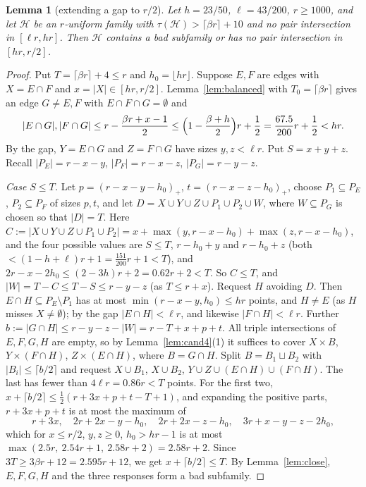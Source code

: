 \documentclass[11pt]{amsart}
\newtheorem{lemma}[theorem]{Lemma}
\theoremstyle{definition}
\theoremstyle{remark}
\newcommand{\cH}{\mathcal H}
\newcommand{\ceil}[1]{\lceil #1\rceil}
\newcommand{\floor}[1]{\lfloor #1\rfloor}
\begin{document}
\begin{lemma}[extending a gap to $r/2$]\label{lem:gapext}
Let $h=23/50$, $\ell=43/200$, $r\ge1000$, and let $\cH$ be an $r$-uniform family with $\tau(\cH)>\ceil{\beta r}+10$ and no pair intersection in $[\ell r,hr]$. Then $\cH$ contains a bad subfamily or has no pair intersection in $[hr,r/2]$.
\end{lemma}
\begin{proof}
Put $T=\ceil{\beta r}+4\le r$ and $h_0=\floor{hr}$. Suppose $E,F$ are edges with $X=E\cap F$ and $x=|X|\in[hr,r/2]$. Lemma~\ref{lem:balanced} with $T_0=\ceil{\beta r}$ gives an edge $G\ne E,F$ with $E\cap F\cap G=\emptyset$ and
\[
|E\cap G|,|F\cap G|\le r-\frac{\beta r+x-1}{2}\le\Bigl(1-\frac{\beta+h}{2}\Bigr)r+\frac12=\frac{67.5}{200}r+\frac12<hr .
\]
By the gap, $Y=E\cap G$ and $Z=F\cap G$ have sizes $y,z<\ell r$. Put $S=x+y+z$. Recall $|P_E|=r-x-y$, $|P_F|=r-x-z$, $|P_G|=r-y-z$.

\emph{Case $S\le T$.} Let $p=(r-x-y-h_0)_+$, $t=(r-x-z-h_0)_+$, choose $P_1\subseteq P_E$, $P_2\subseteq P_F$ of sizes $p,t$, and let $D=X\cup Y\cup Z\cup P_1\cup P_2\cup W$, where $W\subseteq P_G$ is chosen so that $|D|=T$. Here $C:=|X\cup Y\cup Z\cup P_1\cup P_2|=x+\max(y,r-x-h_0)+\max(z,r-x-h_0)$, and the four possible values are $S\le T$, $r-h_0+y$ and $r-h_0+z$ (both $<(1-h+\ell)r+1=\tfrac{151}{200}r+1<T$), and $2r-x-2h_0\le(2-3h)r+2=0.62r+2<T$. So $C\le T$, and $|W|=T-C\le T-S\le r-y-z$ (as $T\le r+x$). Request $H$ avoiding $D$. Then $E\cap H\subseteq P_E\setminus P_1$ has at most $\min(r-x-y,h_0)\le hr$ points, and $H\ne E$ (as $H$ misses $X\ne\emptyset$); by the gap $|E\cap H|<\ell r$, and likewise $|F\cap H|<\ell r$. Further $b:=|G\cap H|\le r-y-z-|W|=r-T+x+p+t$. All triple intersections of $E,F,G,H$ are empty, so by Lemma~\ref{lem:cand4}(1) it suffices to cover $X\times B$, $Y\times(F\cap H)$, $Z\times(E\cap H)$, where $B=G\cap H$. Split $B=B_1\sqcup B_2$ with $|B_i|\le\ceil{b/2}$ and request $X\cup B_1$, $X\cup B_2$, $Y\cup Z\cup(E\cap H)\cup(F\cap H)$. The last has fewer than $4\ell r=0.86r<T$ points. For the first two, $x+\ceil{b/2}\le\tfrac12(r+3x+p+t-T+1)$, and expanding the positive parts, $r+3x+p+t$ is at most the maximum of
\[
r+3x,\quad 2r+2x-y-h_0,\quad 2r+2x-z-h_0,\quad 3r+x-y-z-2h_0,
\]
which for $x\le r/2$, $y,z\ge0$, $h_0>hr-1$ is at most $\max(2.5r,\ 2.54r+1,\ 2.58r+2)=2.58r+2$. Since $3T\ge3\beta r+12=2.595r+12$, we get $x+\ceil{b/2}\le T$. By Lemma~\ref{lem:close}, $E,F,G,H$ and the three responses form a bad subfamily.


\end{proof}
\end{document}
